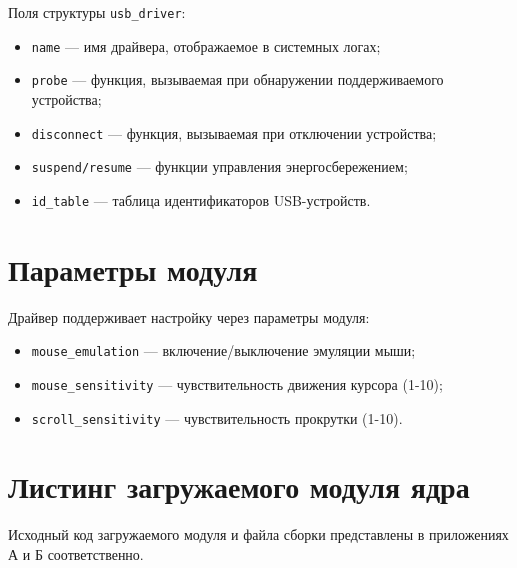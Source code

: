 Поля структуры \texttt{usb\_driver}:
\begin{itemize}[label=---]
	\item \texttt{name} — имя драйвера, отображаемое в системных логах;
	\item \texttt{probe} — функция, вызываемая при обнаружении поддерживаемого устройства;
	\item \texttt{disconnect} — функция, вызываемая при отключении устройства;
	\item \texttt{suspend/resume} — функции управления энергосбережением;
	\item \texttt{id\_table} — таблица идентификаторов USB-устройств.
\end{itemize}

\section{Параметры модуля}

Драйвер поддерживает настройку через параметры модуля:
\begin{itemize}[label=---]
	\item \texttt{mouse\_emulation} — включение/выключение эмуляции мыши;
	\item \texttt{mouse\_sensitivity} — чувствительность движения курсора (1-10);
	\item \texttt{scroll\_sensitivity} — чувствительность прокрутки (1-10).
\end{itemize}

\section{Листинг загружаемого модуля ядра}

Исходный код загружаемого модуля и файла сборки представлены в приложениях А и Б соответственно.